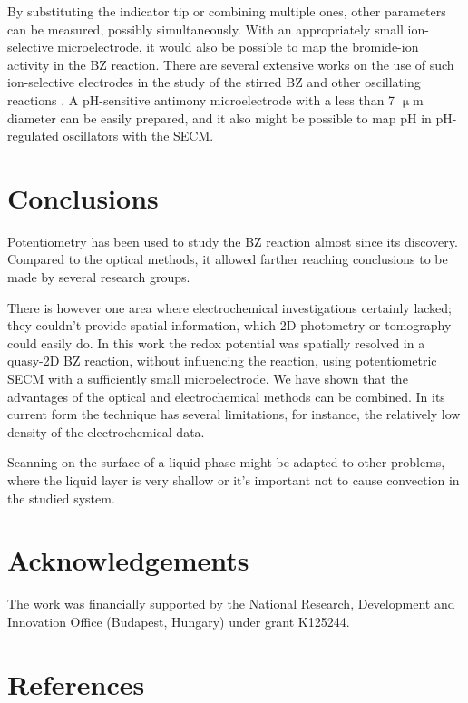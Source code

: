 \documentclass[3p]{elsarticle}
\begin{document}
By substituting the indicator tip or combining multiple ones, other parameters can be measured, possibly simultaneously.
With an appropriately small ion-selective microelectrode, it would also be possible to map the bromide-ion activity in the BZ reaction.
There are several extensive works on the use of such ion-selective electrodes in the study of the stirred BZ and other oscillating reactions \cite{noszticzius1982use, noszticzius1983use}.
A pH-sensitive antimony microelectrode with a less than 7 $\upmu$m diameter can be easily prepared, and it also might be possible to map pH in pH-regulated oscillators \cite{orban2015ph} with the SECM.


\section{Conclusions}
Potentiometry has been used to study the BZ reaction almost since its discovery.
Compared to the optical methods, it allowed farther reaching conclusions to be made by several research groups.

There is however one area where electrochemical investigations certainly lacked; they couldn't provide spatial information, which 2D photometry or tomography could easily do.
In this work the redox potential was spatially resolved in a quasy-2D BZ reaction, without influencing the reaction, using potentiometric SECM with a sufficiently small microelectrode.
We have shown that the advantages of the optical and electrochemical methods can be combined.
In its current form the technique has several limitations, for instance, the relatively low density of the electrochemical data.

Scanning on the surface of a liquid phase might be adapted to other problems, where the liquid layer is very shallow or it's important not to cause convection in the studied system.

\section*{Acknowledgements}
The work was financially supported by the National Research, Development and Innovation Office (Budapest, Hungary) under grant K125244.

\section*{References}
{}

\end{document}
